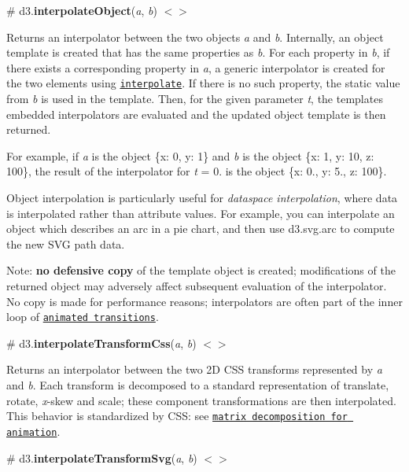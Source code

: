 \label{_interpolateObject}%
\# d3.{\bfseries interpolate\+Object}({\itshape a}, {\itshape b}) \href{https://github.com/d3/d3-interpolate/blob/master/src/object.js}{\tt $<$$>$}

Returns an interpolator between the two objects {\itshape a} and {\itshape b}. Internally, an object template is created that has the same properties as {\itshape b}. For each property in {\itshape b}, if there exists a corresponding property in {\itshape a}, a generic interpolator is created for the two elements using \href{#interpolate}{\tt interpolate}. If there is no such property, the static value from {\itshape b} is used in the template. Then, for the given parameter {\itshape t}, the template\textquotesingle{}s embedded interpolators are evaluated and the updated object template is then returned.

For example, if {\itshape a} is the object {\ttfamily \{x\+: 0, y\+: 1\}} and {\itshape b} is the object {\ttfamily \{x\+: 1, y\+: 10, z\+: 100\}}, the result of the interpolator for {\itshape t} = 0. is the object {\ttfamily \{x\+: 0., y\+: 5., z\+: 100\}}.

Object interpolation is particularly useful for {\itshape dataspace interpolation}, where data is interpolated rather than attribute values. For example, you can interpolate an object which describes an arc in a pie chart, and then use d3.\+svg.\+arc to compute the new S\+VG path data.

Note\+: {\bfseries no defensive copy} of the template object is created; modifications of the returned object may adversely affect subsequent evaluation of the interpolator. No copy is made for performance reasons; interpolators are often part of the inner loop of \href{https://github.com/d3/d3-transition}{\tt animated transitions}.

\label{_interpolateTransformCss}%
\# d3.{\bfseries interpolate\+Transform\+Css}({\itshape a}, {\itshape b}) \href{https://github.com/d3/d3-interpolate/blob/master/src/transform/index.js#L62}{\tt $<$$>$}

Returns an interpolator between the two 2D C\+SS transforms represented by {\itshape a} and {\itshape b}. Each transform is decomposed to a standard representation of translate, rotate, {\itshape x}-\/skew and scale; these component transformations are then interpolated. This behavior is standardized by C\+SS\+: see \href{http://www.w3.org/TR/css3-2d-transforms/#matrix-decomposition}{\tt matrix decomposition for animation}.

\label{_interpolateTransformSvg}%
\# d3.{\bfseries interpolate\+Transform\+Svg}({\itshape a}, {\itshape b}) \href{https://github.com/d3/d3-interpolate/blob/master/src/transform/index.js#L63}{\tt $<$$>$}

